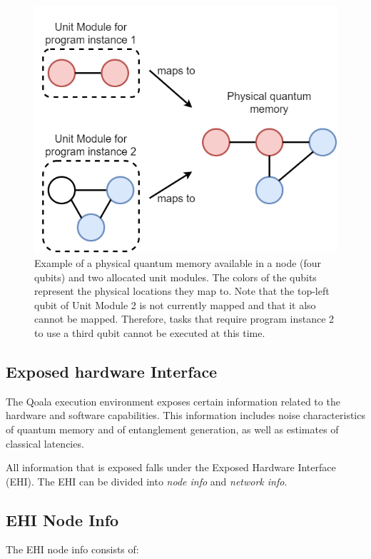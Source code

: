 \begin{figure}[ht]
    \centering
    \includegraphics[scale=0.4]{figures/qoala/unit_module.png}
    \caption{Example of a physical quantum memory available in a node (four qubits) and two allocated unit modules. The colors of the qubits represent the physical locations they map to. Note that the top-left qubit of Unit Module 2 is not currently mapped and that it also cannot be mapped. Therefore, tasks that require program instance 2 to use a third qubit cannot be executed at this time.}
    \label{fig:app:unit_module}
\end{figure}



\subsection{Exposed hardware Interface}
\label{sec:app:ehi}
The Qoala execution environment exposes certain information related to the hardware and software capabilities.
This information includes noise characteristics of quantum memory and of entanglement generation, as well as estimates of classical latencies.

All information that is exposed falls under the Exposed Hardware Interface (EHI).
The EHI can be divided into \textit{node info} and \textit{network info}.


\subsection{EHI Node Info}
The EHI node info consists of:

